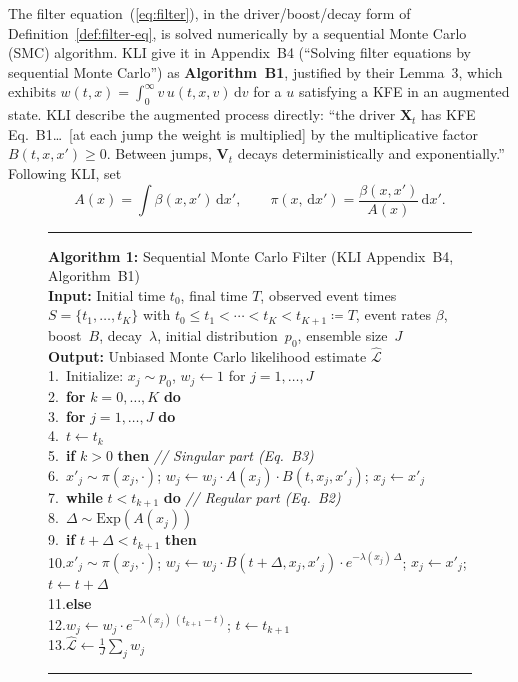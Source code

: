 \documentclass[11pt,leqno]{article}
\newcounter{algline}
\newenvironment{algorithm}[1][ht!]{%
  \begin{figure}[#1]\centering\begin{minipage}{0.92\textwidth}%
  \hrule\smallskip\setcounter{algline}{0}%
}{\smallskip\hrule\end{minipage}\end{figure}}
\newcommand{\Xr}{\mathbf{X}}        %
\newcommand{\Vr}{\mathbf{V}}        %
\newcommand{\dd}[1]{\,\mathrm{d}{#1}}
\newcommand{\lik}{\mathcal{L}}      %
\theoremstyle{plain}
\theoremstyle{definition}
\begin{document}
The filter equation~(\ref{eq:filter}), in the driver/boost/decay form
of Definition~\ref{def:filter-eq}, is solved numerically by a
sequential Monte Carlo (SMC) algorithm.  KLI give it in
Appendix~B4 (``Solving filter equations by sequential Monte Carlo'') as
\textbf{Algorithm~B1}, justified by their Lemma~3, which exhibits
$w(t,x) = \int_0^\infty v\,u(t,x,v)\dd{v}$ for a $u$ satisfying a KFE
in an augmented state.  KLI describe the augmented process directly:
``the driver $\Xr_t$ has KFE Eq.~B1\ldots\ [at each jump the weight is
multiplied] by the multiplicative factor $B(t,x,x') \ge 0$.  Between
jumps, $\Vr_t$ decays deterministically and exponentially.''
Following KLI, set
\[
  A(x) = \int \beta(x,x')\dd{x'},
  \qquad
  \pi(x, \dd{x'}) = \frac{\beta(x,x')}{A(x)}\dd{x'}.
\]

\begin{algorithm}
\textbf{Algorithm 1:} Sequential Monte Carlo Filter
(KLI Appendix~B4, Algorithm~B1)\\[4pt]
\textbf{Input:} Initial time $t_0$, final time $T$, observed event times
  $S = \{t_1, \ldots, t_K\}$ with
  $t_0 \le t_1 < \cdots < t_K < t_{K+1} \coloneqq T$,
  event rates $\beta$, boost~$B$,
  decay~$\lambda$, initial distribution~$p_0$, ensemble size~$J$\\[2pt]
\textbf{Output:} Unbiased Monte Carlo likelihood estimate $\hat{\lik}$\\[4pt]
1.~Initialize: $x_j \sim p_0$, $w_j \gets 1$ for $j = 1,\ldots,J$\\
2.~\textbf{for} $k = 0, \ldots, K$ \textbf{do}\\
3.~\quad \textbf{for} $j = 1, \ldots, J$ \textbf{do}\\
4.~\qquad $t \gets t_k$\\
5.~\qquad \textbf{if} $k > 0$ \textbf{then} \hfill\textit{// Singular part (Eq.\ B3)}\\
6.~\qquad\quad $x'_j \sim \pi(x_j, \cdot)$;
   $w_j \gets w_j \cdot A(x_j) \cdot B(t, x_j, x'_j)$;
   $x_j \gets x'_j$\\
7.~\qquad \textbf{while} $t < t_{k+1}$ \textbf{do} \hfill\textit{// Regular part (Eq.\ B2)}\\
8.~\qquad\quad $\Delta \sim \mathrm{Exp}(A(x_j))$\\
9.~\qquad\quad \textbf{if} $t + \Delta < t_{k+1}$ \textbf{then}\\
10.\qquad\qquad $x'_j \sim \pi(x_j, \cdot)$;
   $w_j \gets w_j \cdot B(t{+}\Delta, x_j, x'_j) \cdot
   e^{-\lambda(x_j)\,\Delta}$;
   $x_j \gets x'_j$; $t \gets t + \Delta$\\
11.\qquad\quad \textbf{else}\\
12.\qquad\qquad $w_j \gets w_j \cdot e^{-\lambda(x_j)\,(t_{k+1}-t)}$;
   $t \gets t_{k+1}$\\
13.$\hat{\lik} \gets \frac{1}{J}\sum_j w_j$
\label{alg:smc}
\end{algorithm}
\end{document}
